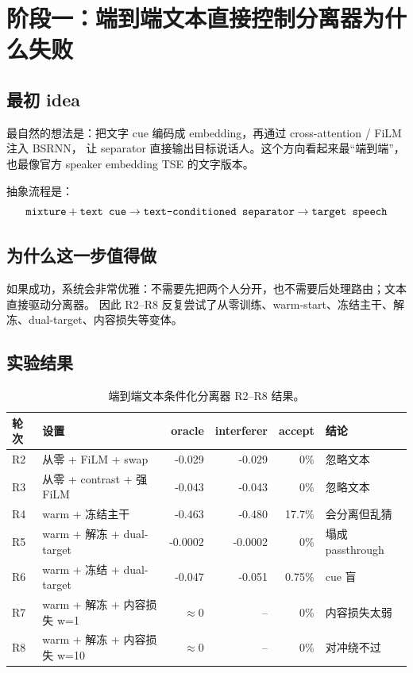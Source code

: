 \documentclass[UTF8,zihao=-4]{ctexart}
\newcommand{\code}[1]{\texttt{\detokenize{#1}}}
\begin{document}
\newpage
\section{阶段一：端到端文本直接控制分离器为什么失败}

\subsection{最初 idea}

最自然的想法是：把文字 cue 编码成 embedding，再通过 cross-attention / FiLM 注入 BSRNN，
让 separator 直接输出目标说话人。这个方向看起来最“端到端”，也最像官方 speaker embedding
TSE 的文字版本。

抽象流程是：
\[
\code{mixture} + \code{text cue}
\rightarrow
\code{text-conditioned separator}
\rightarrow
\code{target speech}
\]

\subsection{为什么这一步值得做}

如果成功，系统会非常优雅：不需要先把两个人分开，也不需要后处理路由；文本直接驱动分离器。
因此 R2--R8 反复尝试了从零训练、warm-start、冻结主干、解冻、dual-target、内容损失等变体。

\subsection{实验结果}

\begin{table}[h]
\centering
\begin{tabularx}{\linewidth}{llrrrX}
\toprule
轮次 & 设置 & oracle & interferer & accept & 结论 \\
\midrule
R2 & 从零 + FiLM + swap & -0.029 & -0.029 & 0\% & 忽略文本 \\
R3 & 从零 + contrast + 强 FiLM & -0.043 & -0.043 & 0\% & 忽略文本 \\
R4 & warm + 冻结主干 & -0.463 & -0.480 & 17.7\% & 会分离但乱猜 \\
R5 & warm + 解冻 + dual-target & -0.0002 & -0.0002 & 0\% & 塌成 passthrough \\
R6 & warm + 冻结 + dual-target & -0.047 & -0.051 & 0.75\% & cue 盲 \\
R7 & warm + 解冻 + 内容损失 w=1 & $\approx$0 & -- & 0\% & 内容损失太弱 \\
R8 & warm + 解冻 + 内容损失 w=10 & $\approx$0 & -- & 0\% & 对冲绕不过 \\
\bottomrule
\end{tabularx}
\caption{端到端文本条件化分离器 R2--R8 结果。}
\end{table}
\end{document}
